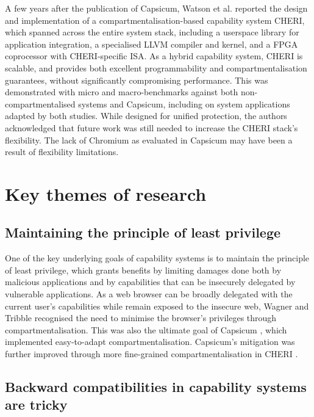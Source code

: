 \documentclass[11pt]{article}
\begin{document}
A few years after the publication of Capsicum, Watson et al. \cite{watson2015cheri} reported the design and implementation of a compartmentalisation-based capability system CHERI, which spanned across the entire system stack, including a userspace library for application integration, a specialised LLVM compiler and kernel, and a FPGA coprocessor with CHERI-specific ISA. As a hybrid capability system, CHERI is scalable, and provides both excellent programmability and compartmentalisation guarantees, without significantly compromising performance. This was demonstrated with micro and macro-benchmarks against both non-compartmentalised systems and Capsicum, including on system applications adapted by both studies. While designed for unified protection, the authors acknowledged that future work was still needed to increase the CHERI stack's flexibility. The lack of Chromium as evaluated in Capsicum may have been a result of flexibility limitations.

\section{Key themes of research}

\subsection{Maintaining the principle of least privilege}

One of the key underlying goals of capability systems is to maintain the principle of least privilege, which grants benefits by  limiting damages done both by malicious applications and by capabilities that can be insecurely delegated by vulnerable applications. As a web browser can be broadly delegated with the current user's capabilities while remain exposed to the insecure web, Wagner and Tribble \cite[4.1]{wagner2002security} recognised the need to minimise the browser's privileges through compartmentalisation. This was also the ultimate goal of Capsicum \cite[Sec. 1]{watson2010capsicum}, which implemented easy-to-adapt compartmentalisation. Capsicum's mitigation was further improved through more fine-grained compartmentalisation in CHERI \cite[Sec. II]{watson2015cheri}.

\subsection{Backward compatibilities in capability systems are tricky}
\end{document}
